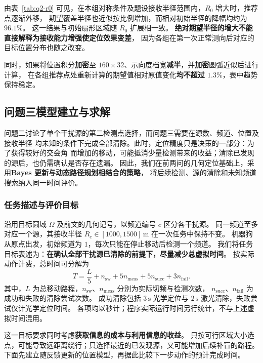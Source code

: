 \documentclass[UTF8,a4paper,12pt]{ctexart}
\begin{document}
由表~\ref{tab:q2-r0} 可见，在本组对称条件及题设接收半径范围内，$R_0$ 增大时，推荐点逐渐外移，
期望覆盖半径也近似按比例增加，而相对初始半径的降幅均约为 $96.1\%$。
这一结果与初始扇形区域随 $R_0$ 扩展相一致。
\textbf{绝对期望半径的增大不能直接解释为接收能力增强使定位效果变差}，
因为各组在第一次正常测向后对应的目标位置分布也随之改变。

同时，如果将位置积分\textbf{加密}至 $160\times32$、示向度档宽\textbf{减半}，并\textbf{加密}圆弧近似后进行计算，
在各组推荐点处重新计算的期望值相对原值变化\textbf{均不超过 $1.3\%$}，表中趋势保持稳定。

\subsection{问题三模型建立与求解}
\label{sec:q3}

问题二讨论了单个干扰源的第二检测点选择，而问题三需要在源数、频道、位置及接收半径
均未知的条件下完成全部清除。此时，定位精度只是决策的一部分：为了获得较好的交会角
而增加的移动，可能抵消少量检测带来的收益；清除已发现的源后，也仍需确认是否存在遗漏。
因此，我们在前两问的几何定位基础上，采用\textbf{Bayes 更新与动态路径规划相结合的策略}，
将后续检测、源的清除和未知频道搜索纳入同一时间评价。

\subsubsection{任务描述与评价目标}

沿用目标圆域 $\Omega$ 及前文的几何记号，以频道编号 $c$ 区分各干扰源。
同一频道至多对应一个源，其接收半径 $R_c\in[1000,1500]\,\mathrm m$ 在一次任务中保持不变。
机器狗从原点出发，初始频道为 $1$，每次只能在停止移动后检测一个频道。
我们将任务目标表述为：\textbf{在确认全部干扰源已清除的前提下，尽量减少总虚拟时间}。
按实际动作计费，总时间可分解为
\begin{equation}
  T=\frac{L}{5}+n_{\mathrm{sw}}+5n_{\mathrm{meas}}
    +5n_{\mathrm{succ}}+3n_{\mathrm{fail}}.
  \label{eq:q3-time}
\end{equation}
其中，$L$ 为总移动路程，$n_{\mathrm{sw}}$、$n_{\mathrm{meas}}$ 分别为实际切频与检测次数，
$n_{\mathrm{succ}}$、$n_{\mathrm{fail}}$ 为成功和失败的清除尝试次数。
成功清除包括 $3\,\mathrm s$ 光学定位与 $2\,\mathrm s$ 激光清除，失败尝试仅计光学定位时间。
各项均以秒计；程序实际运行时间另行统计，不与上述虚拟时间混用。

这一目标要求同时考虑\textbf{获取信息的成本与利用信息的收益}。
只按可行区域大小选点，可能导致远距离绕行；只选择最近的已发现源，又可能增加后续补盲的路程。
下面先建立随反馈更新的位置模型，再据此比较下一步动作的预计完成时间。
\end{document}
